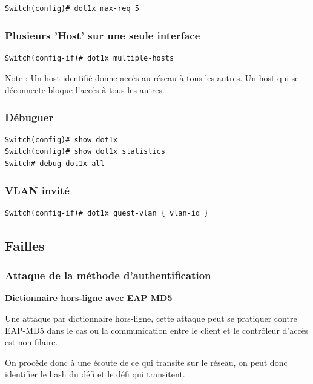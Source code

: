 \begin{verbatim}
Switch(config)# dot1x max-req 5
\end{verbatim}

\subsubsection{Plusieurs 'Host' sur une seule interface}

\begin{verbatim}
Switch(config-if)# dot1x multiple-hosts
\end{verbatim}

Note : Un host identifié donne accès au réseau à tous les autres. Un host qui se déconnecte bloque l'accès à tous les autres.

\subsubsection{Débuguer}

\begin{verbatim}
Switch(config)# show dot1x
Switch(config)# show dot1x statistics
Switch# debug dot1x all
\end{verbatim}

\subsubsection{VLAN invité}

\begin{verbatim}
Switch(config-if)# dot1x guest-vlan { vlan-id }
\end{verbatim}

\subsection{Failles}

\subsubsection{Attaque de la méthode d'authentification}

\textbf{Dictionnaire hors-ligne avec EAP MD5}

Une attaque par dictionnaire hors-ligne, cette attaque peut se pratiquer contre EAP-MD5 dans le cas ou la communication entre le client et le contrôleur d'accès est non-filaire. 

On procède donc à une écoute de ce qui transite sur le réseau, on peut donc identifier le hash du défi et le défi qui transitent. 

